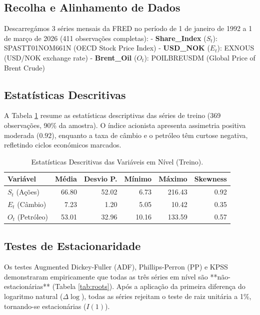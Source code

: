 \documentclass[11pt,a4paper]{article}
\begin{document}
\subsection{Recolha e Alinhamento de Dados}
Descarregámos 3 séries mensais da FRED no período de 1 de janeiro de 1992 a 1 de março de 2026 (411 observações completas):
- \textbf{Share\_Index} ($S_t$): SPASTT01NOM661N (OECD Stock Price Index)
- \textbf{USD\_NOK} ($E_t$): EXNOUS (USD/NOK exchange rate)
- \textbf{Brent\_Oil} ($O_t$): POILBREUSDM (Global Price of Brent Crude)

\subsection{Estatísticas Descritivas}
A Tabela \ref{tab:desc} resume as estatísticas descriptivas das séries de treino (369 observações, 90\% da amostra). O índice acionista apresenta assimetria positiva moderada ($0.92$), enquanto a taxa de câmbio e o petróleo têm curtose negativa, refletindo ciclos económicos marcados.

\begin{table}[ht]
\centering
\small
\begin{tabular}{lrrrrr}
\toprule
\textbf{Variável} & \textbf{Média} & \textbf{Desvio P.} & \textbf{Mínimo} & \textbf{Máximo} & \textbf{Skewness} \\
\midrule
$S_t$ (Ações) & 66.80 & 52.02 & 6.73 & 216.43 & 0.92 \\
$E_t$ (Câmbio) & 7.23 & 1.20 & 5.05 & 10.42 & 0.35 \\
$O_t$ (Petróleo) & 53.01 & 32.96 & 10.16 & 133.59 & 0.57 \\
\bottomrule
\end{tabular}
\caption{Estatísticas Descritivas das Variáveis em Nível (Treino).}
\label{tab:desc}
\end{table}

\subsection{Testes de Estacionaridade}
Os testes Augmented Dickey-Fuller (ADF), Phillips-Perron (PP) e KPSS demonstraram empiricamente que todas as três séries em nível são **não-estacionárias** (Tabela \ref{tab:roots}). Após a aplicação da primeira diferença do logaritmo natural ($\Delta \log$), todas as séries rejeitam o teste de raiz unitária a 1\%, tornando-se estacionárias ($I(1)$).
\end{document}
